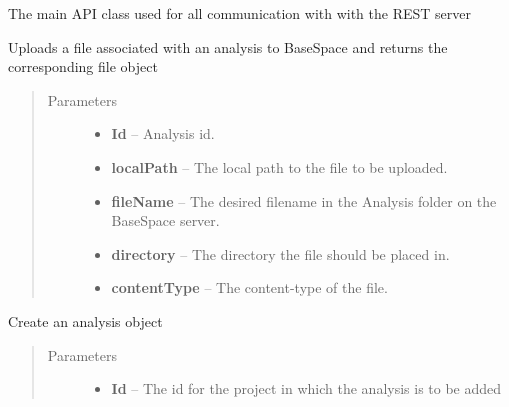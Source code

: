 \documentclass[letterpaper,10pt,english]{sphinxmanual}
\begin{document}
\begin{fulllineitems}
\label{Available modules:BaseSpacePy.api.BaseSpaceAPI.BaseSpaceAPI}
The main API class used for all communication with with the REST server

\begin{fulllineitems}
\label{Available modules:BaseSpacePy.api.BaseSpaceAPI.BaseSpaceAPI.analysisFileUpload}
Uploads a file associated with an analysis to BaseSpace and returns the corresponding file object
\begin{quote}\begin{description}
\item[{Parameters}] \leavevmode\begin{itemize}
\item {} 
\textbf{Id} -- Analysis id.

\item {} 
\textbf{localPath} -- The local path to the file to be uploaded.

\item {} 
\textbf{fileName} -- The desired filename in the Analysis folder on the BaseSpace server.

\item {} 
\textbf{directory} -- The directory the file should be placed in.

\item {} 
\textbf{contentType} -- The content-type of the file.

\end{itemize}

\end{description}\end{quote}

\end{fulllineitems}


\begin{fulllineitems}
\label{Available modules:BaseSpacePy.api.BaseSpaceAPI.BaseSpaceAPI.createAnalyses}
Create an analysis object
\begin{quote}\begin{description}
\item[{Parameters}] \leavevmode\begin{itemize}
\item {} 
\textbf{Id} -- The id for the project in which the analysis is to be added


\end{itemize}
\end{description}
\end{quote}
\end{fulllineitems}
\end{fulllineitems}
\end{document}
